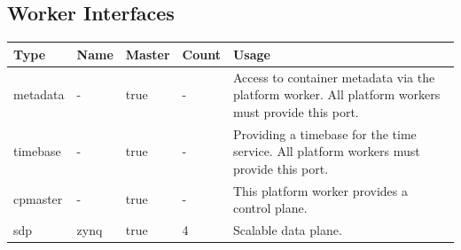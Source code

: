 \documentclass{article}
\begin{document}
\begin{landscape}
	\section*{Worker Interfaces}
	\begin{scriptsize}
		\begin{tabular}{|M{2cm}|M{2cm}|M{1.5cm}|M{1.5cm}|M{14.5cm}|}
			\hline
			Type       & Name & Master & Count & Usage                  \\
			\hline
			metadata   & -    & true   & -     & Access to container metadata via the platform worker. All platform workers must provide this port. \\
			\hline
			timebase   & -    & true   & -     & Providing a timebase for the time service. All platform workers must provide this port. \\
			\hline
			cpmaster   & -    & true   & -     & This platform worker provides a control plane. \\
			\hline
			sdp        & zynq & true   & 4     & Scalable data plane. \\
			\hline
		\end{tabular}
	\end{scriptsize}

\end{landscape}
\pagebreak
\end{document}
